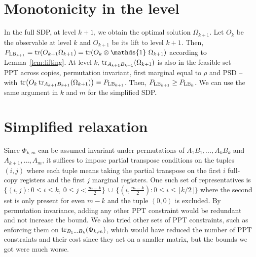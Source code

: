 \documentclass[11pt,a4paper]{report}
\newcommand{\one}{\mathds{1}}
\newcommand{\I}{\one}
\newcounter{reptag}
\newif\iftags \tagsfalse   %
\newcommand{\reptagbox}[3]{\iftags\par\smallskip\noindent\refstepcounter{reptag}%
  \fcolorbox{#1}{#1!7}{\parbox{\dimexpr\linewidth-2\fboxsep-2\fboxrule\relax}{\small
  \textcolor{#1}{\textbf{[\thereptag]\ #2.}}\ #3}}\par\smallskip\fi}
\newcommand{\detail}[1]{\reptagbox{tagD}{More detail}{#1}}
\newcommand{\deeper}[1]{\reptagbox{tagP}{Deeper proof}{#1}}
\begin{document}
\section{Monotonicity in the level}\label{app:monotonicity}
In the full SDP, at level $k+1$, we obtain the optimal solution $\Omega_{k+1}$. Let $O_k$ be the observable at level $k$ and $O_{k+1}$ be its lift to level $k+1$. Then, $P_{{\rm LB}_{k+1}} = \tr(O_{k+1} \Omega_{k+1})=\tr(O_k \otimes \I \ \Omega_{k+1})$ according to Lemma~\ref{lem:lifting}. At level $k$, $\tr_{A_{k+1}B_{k+1}}(\Omega_{k+1})$ is also in the feasible set -- PPT across copies, permutation invariant, first marginal equal to $\rho$ and PSD -- with $\tr(O_k \tr_{A_{k+1}B_{k+1}}(\Omega_{k+1})) = P_{{\rm LB}_{k+1}}$. Then, $P_{{\rm LB}_{k+1}} \geq P_{{\rm LB}_{k}}$.
We can use the same argument in $k$ and $m$ for the simplified SDP.
\deeper{Write out the simplified case instead of ``the same argument'': which registers are traced out to go from $(k,m+1)$ to $(k,m)$ and from $(k+1,m)$ to $(k,m)$, and which constraints survive each step.}

\section{Simplified relaxation}\label{sec:pptReps}
Since $\Phi_{k,m}$ can be assumed invariant under permutations of $A_1B_1, \dots, A_kB_k$ and $A_{k+1}, \dots, A_m$, it suffices to impose partial transpose conditions on the tuples $(i, j)$ where each tuple means taking the partial transpose on the first $i$ full-copy registers and the first $j$ marginal registers. One such set of representatives is $\{(i,j):0\leq i\leq k,\ 0\leq j<\tfrac{m-k}{2}\}\ \cup\ \{(i,\tfrac{m-k}{2}):0\leq i\leq\lfloor k/2\rfloor\}$ where the second set is only present for even $m-k$ and the tuple $(0,0)$ is excluded. By permutation invariance, adding any other PPT constraint would be redundant and not increase the bound. We also tried other sets of PPT constraints, such as enforcing them on $\tr_{B_1 \dots B_k}(\Phi_{k,m})$, which would have reduced the number of PPT constraints and their cost since they act on a smaller matrix, but the bounds we got were much worse.
\detail{Check each constraint on $\omega_{k,m}$ as for the full SDP, and give the counting argument behind the set of PPT representatives, with a small case such as $k=2$, $m=4$.}
\deeper{Write out $P_{{\rm LB}_k}\le P_{{\rm LB}_{k,m}}$. It needs the lifting lemma on the $A$ registers only, using that $\tr_B\Phi_{k,m}$ is permutation invariant (the fourth constraint), to move $O_P$ from $A_1,\dots,A_m$ to $A_1,\dots,A_k$; otherwise the objective is not defined on $\Phi_k$.}
\end{document}
